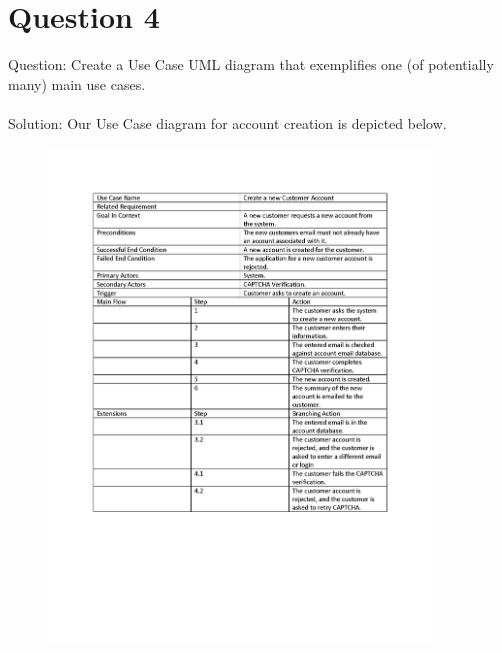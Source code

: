 \documentclass{article}
\begin{document}
\section*{Question 4}
Question: Create a Use Case UML diagram that exemplifies one (of potentially many) main use cases. \\\\
Solution: Our Use Case diagram for account creation is depicted below. \\
\begin{figure}[h]
	\includegraphics[width=4in]{UseCaseName.jpg}
\end{figure}

\newpage
\end{document}
